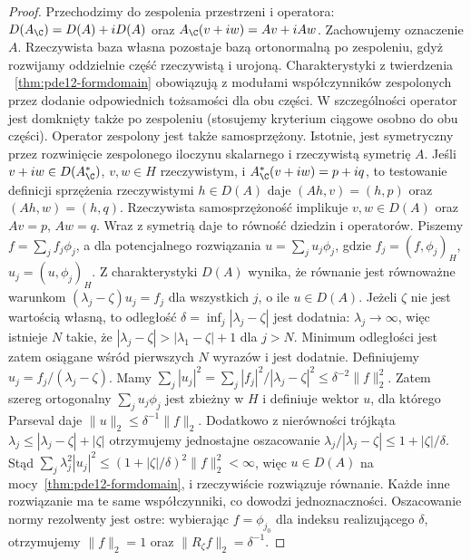 \begin{proof}
Przechodzimy do zespolenia przestrzeni i operatora:
$D(A_\C)=D(A)+iD(A)$ oraz
$A_\C(v+iw)=Av+iAw$. Zachowujemy oznaczenie $A$.
Rzeczywista baza własna pozostaje bazą ortonormalną
po zespoleniu, gdyż rozwijamy oddzielnie część rzeczywistą
i urojoną. Charakterystyki z twierdzenia
~\ref{thm:pde12-formdomain} obowiązują z modułami
współczynników zespolonych przez dodanie odpowiednich
tożsamości dla obu części. W szczególności operator
jest domknięty także po zespoleniu (stosujemy kryterium
ciągowe osobno do obu części).
Operator zespolony jest także samosprzężony.
Istotnie, jest symetryczny przez rozwinięcie zespolonego
iloczynu skalarnego i rzeczywistą symetrię $A$.
Jeśli $v+iw\in D(A_\C^*)$, $v,w\in H$ rzeczywistym,
i $A_\C^*(v+iw)=p+iq$, to testowanie definicji
sprzężenia rzeczywistymi $h\in D(A)$ daje
$(Ah,v)=(h,p)$ oraz $(Ah,w)=(h,q)$.
Rzeczywista samosprzężoność implikuje $v,w\in D(A)$
oraz $Av=p$, $Aw=q$. Wraz z symetrią daje to równość
dziedzin i operatorów.
Piszemy $f=\sum_jf_j\phi_j$, a dla potencjalnego
rozwiązania $u=\sum_ju_j\phi_j$, gdzie
$f_j=(f,\phi_j)_H$, $u_j=(u,\phi_j)_H$.
Z charakterystyki $D(A)$ wynika, że równanie jest
równoważne warunkom $(\lambda_j-\zeta)u_j=f_j$
dla wszystkich $j$, o ile $u\in D(A)$.
Jeżeli $\zeta$ nie jest wartością własną, to odległość
$\delta=\inf_j|\lambda_j-\zeta|$ jest dodatnia:
$\lambda_j\to\infty$, więc istnieje $N$ takie, że
$|\lambda_j-\zeta|>|\lambda_1-\zeta|+1$ dla $j>N$.
Minimum odległości jest zatem osiągane wśród pierwszych
$N$ wyrazów i jest dodatnie. Definiujemy $u_j=f_j/(\lambda_j-\zeta)$.
Mamy
$\sum_j|u_j|^2=\sum_j|f_j|^2/|\lambda_j-\zeta|^2
\le\delta^{-2}\|f\|_2^2$.
Zatem szereg ortogonalny $\sum_j u_j\phi_j$ jest zbieżny
w $H$ i definiuje wektor $u$, dla którego Parseval daje
$\|u\|_2\le\delta^{-1}\|f\|_2$.
Dodatkowo z nierówności trójkąta
$\lambda_j\le|\lambda_j-\zeta|+|\zeta|$ otrzymujemy
jednostajne oszacowanie
$\lambda_j/|\lambda_j-\zeta|\le1+|\zeta|/\delta$.
Stąd $\sum_j\lambda_j^2|u_j|^2
\le(1+|\zeta|/\delta)^2\|f\|_2^2<\infty$,
więc $u\in D(A)$ na mocy~\ref{thm:pde12-formdomain},
i rzeczywiście rozwiązuje równanie. Każde inne rozwiązanie
ma te same współczynniki, co dowodzi jednoznaczności.
Oszacowanie normy rezolwenty jest ostre: wybierając
$f=\phi_{j_0}$ dla indeksu realizującego $\delta$,
otrzymujemy $\|f\|_2=1$ oraz $\|R_\zeta f\|_2=\delta^{-1}$.


\end{proof}
